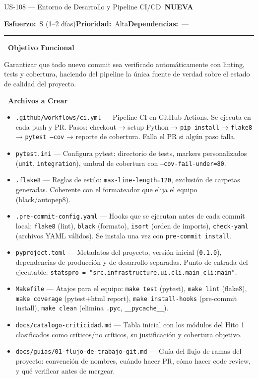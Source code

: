 \documentclass[11pt,a4paper]{article}
\newcommand{\fpath}[1]{\texttt{\small #1}}
\newcommand{\usfield}[2][\;]{%
  \par\vspace{5pt}%
  {\small\textbf{\textcolor{primary}{#2}}}\par\vspace{2pt}%
}
\newcommand{\usmeta}[3]{%
  \vspace{2pt}%
  {\small\textcolor{secondary}{%
    \textbf{Esfuerzo:}~#1\quad\textbf{Prioridad:}~#2\quad\textbf{Dependencias:}~#3%
  }}%
  \par\vspace{4pt}%
  \textcolor{bordergray}{\rule{\linewidth}{0.4pt}}\par\vspace{4pt}%
}
\newcommand{\tagnew}{\,\colorbox{tagnew}{\tiny\bfseries NUEVA}\,}
\begin{document}
\begin{uscard}{US-108 — Entorno de Desarrollo y Pipeline CI/CD \tagnew}

\usmeta{S (1–2 días)}{Alta}{—}

\usfield{\faAlignLeft\ Objetivo Funcional}
Garantizar que todo nuevo commit sea verificado automáticamente con linting, tests y cobertura, haciendo del pipeline la única fuente de verdad sobre el estado de calidad del proyecto.

\usfield{\faFolderOpen\ Archivos a Crear}
\begin{itemize}[nosep, leftmargin=1.6em]
  \item \fpath{.github/workflows/ci.yml} — Pipeline CI en GitHub Actions. Se ejecuta en cada push y PR. Pasos: checkout → setup Python → \fpath{pip install} → \fpath{flake8} → \fpath{pytest --cov} → reporte de cobertura. Falla el PR si algún paso falla.
  \item \fpath{pytest.ini} — Configura pytest: directorio de tests, markers personalizados (\fpath{unit}, \fpath{integration}), umbral de cobertura con \fpath{--cov-fail-under=80}.
  \item \fpath{.flake8} — Reglas de estilo: \fpath{max-line-length=120}, exclusión de carpetas generadas. Coherente con el formateador que elija el equipo (black/autopep8).
  \item \fpath{.pre-commit-config.yaml} — Hooks que se ejecutan antes de cada commit local: \fpath{flake8} (lint), \fpath{black} (formato), \fpath{isort} (orden de imports), \fpath{check-yaml} (archivos YAML válidos). Se instala una vez con \fpath{pre-commit install}.
  \item \fpath{pyproject.toml} — Metadatos del proyecto, versión inicial (\fpath{0.1.0}), dependencias de producción y de desarrollo separadas. Punto de entrada del ejecutable: \fpath{statspro = "src.infrastructure.ui.cli.main\_cli:main"}.
  \item \fpath{Makefile} — Atajos para el equipo: \fpath{make test} (pytest), \fpath{make lint} (flake8), \fpath{make coverage} (pytest+html report), \fpath{make install-hooks} (pre-commit install), \fpath{make clean} (elimina \fpath{.pyc}, \fpath{\_\_pycache\_\_}).
  \item \fpath{docs/catalogo-criticidad.md} — Tabla inicial con los módulos del Hito 1 clasificados como críticos/no críticos, su justificación y cobertura objetivo.
  \item \fpath{docs/guias/01-flujo-de-trabajo-git.md} — Guía del flujo de ramas del proyecto: convención de nombres, cuándo hacer PR, cómo hacer code review, y qué verificar antes de mergear.
\end{itemize}


\end{uscard}
\end{document}
